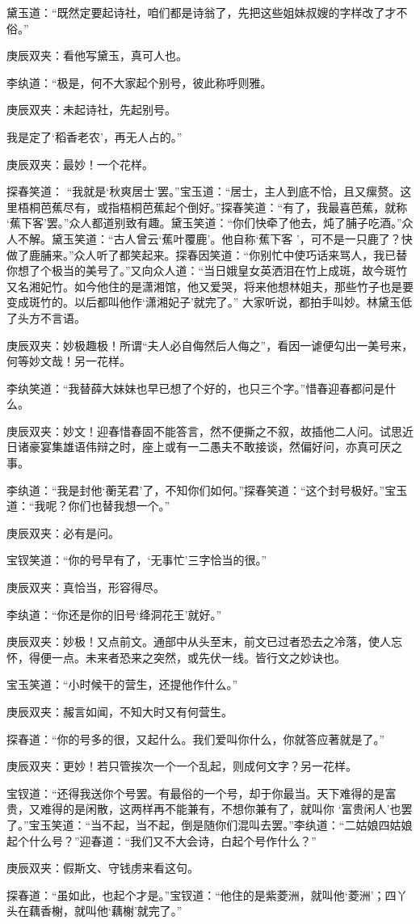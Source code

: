 \begin{parag}
    黛玉道：“既然定要起诗社，咱们都是诗翁了，先把这些姐妹叔嫂的字样改了才不俗。”\begin{note}庚辰双夹：看他写黛玉，真可人也。\end{note}李纨道：“极是，何不大家起个别号，彼此称呼则雅。\begin{note}庚辰双夹：未起诗社，先起别号。\end{note}我是定了‘稻香老农’，再无人占的。”\begin{note}庚辰双夹：最妙！一个花样。\end{note}探春笑道： “我就是‘秋爽居士’罢。”宝玉道：“居士，主人到底不恰，且又瘰赘。这里梧桐芭蕉尽有，或指梧桐芭蕉起个倒好。”探春笑道：“有了，我最喜芭蕉，就称 ‘蕉下客’罢。”众人都道别致有趣。黛玉笑道：“你们快牵了他去，炖了脯子吃酒。”众人不解。黛玉笑道：“古人曾云‘蕉叶覆鹿’。他自称‘蕉下客 ’，可不是一只鹿了？快做了鹿脯来。”众人听了都笑起来。探春因笑道：“你别忙中使巧话来骂人，我已替你想了个极当的美号了。”又向众人道：“当日娥皇女英洒泪在竹上成斑，故今斑竹又名湘妃竹。如今他住的是潇湘馆，他又爱哭，将来他想林姐夫，那些竹子也是要变成斑竹的。以后都叫他作‘潇湘妃子’就完了。” 大家听说，都拍手叫妙。林黛玉低了头方不言语。\begin{note}庚辰双夹：妙极趣极！所谓“夫人必自侮然后人侮之”，看因一谑便勾出一美号来，何等妙文哉！另一花样。\end{note}李纨笑道：“我替薛大妹妹也早已想了个好的，也只三个字。”惜春迎春都问是什么。\begin{note}庚辰双夹：妙文！迎春惜春固不能答言，然不便撕之不叙，故插他二人问。试思近日诸豪宴集雄语伟辩之时，座上或有一二愚夫不敢接谈，然偏好问，亦真可厌之事。\end{note}李纨道：“我是封他‘蘅芜君’了，不知你们如何。”探春笑道：“这个封号极好。”宝玉道：“我呢？你们也替我想一个。”\begin{note}庚辰双夹：必有是问。\end{note}宝钗笑道：“你的号早有了，‘无事忙’三字恰当的很。”\begin{note}庚辰双夹：真恰当，形容得尽。\end{note}李纨道：“你还是你的旧号‘绛洞花王’就好。”\begin{note}庚辰双夹：妙极！又点前文。通部中从头至末，前文已过者恐去之冷落，使人忘怀，得便一点。未来者恐来之突然，或先伏一线。皆行文之妙诀也。\end{note}宝玉笑道：“小时候干的营生，还提他作什么。”\begin{note}庚辰双夹：赧言如闻，不知大时又有何营生。\end{note}探春道：“你的号多的很，又起什么。我们爱叫你什么，你就答应著就是了。”\begin{note}庚辰双夹：更妙！若只管挨次一个一个乱起，则成何文字？另一花样。\end{note}宝钗道：“还得我送你个号罢。有最俗的一个号，却于你最当。天下难得的是富贵，又难得的是闲散，这两样再不能兼有，不想你兼有了，就叫你 ‘富贵闲人’也罢了。”宝玉笑道：“当不起，当不起，倒是随你们混叫去罢。”李纨道：“二姑娘四姑娘起个什么号？”迎春道：“我们又不大会诗，白起个号作什么？”\begin{note}庚辰双夹：假斯文、守钱虏来看这句。\end{note}探春道：“虽如此，也起个才是。”宝钗道：“他住的是紫菱洲，就叫他‘菱洲’；四丫头在藕香榭，就叫他‘藕榭’就完了。”

\end{parag}
